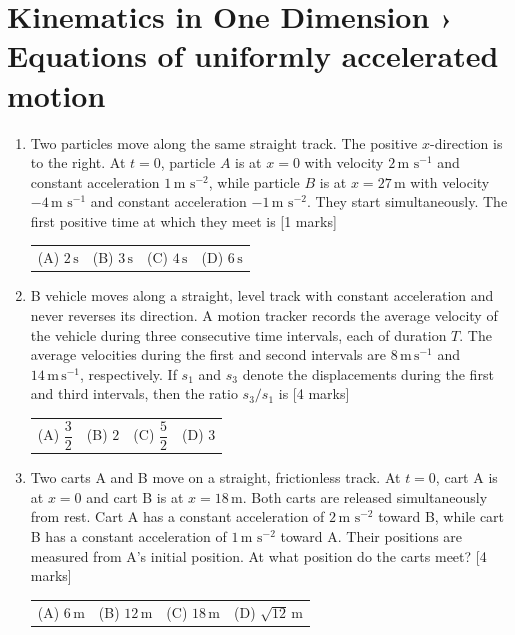 \documentclass[11pt,a4paper]{article}
\begin{document}
\section*{Kinematics in One Dimension › Equations of uniformly accelerated motion}
\begin{enumerate}[resume]
\item Two particles move along the same straight track. The positive $x$-direction is to the right. At $t=0$, particle $A$ is at $x=0$ with velocity $2\,\text{m s}^{-1}$ and constant acceleration $1\,\text{m s}^{-2}$, while particle $B$ is at $x=27\,\text{m}$ with velocity $-4\,\text{m s}^{-1}$ and constant acceleration $-1\,\text{m s}^{-2}$. They start simultaneously. The first positive time at which they meet is \hfill [1 marks]
{\renewcommand{\arraystretch}{1.8}
\begin{tabularx}{\linewidth}{X X X X}
(A) \quad $2\,\text{s}$ & (B) \quad $3\,\text{s}$ & (C) \quad $4\,\text{s}$ & (D) \quad $6\,\text{s}$ \\[10pt]
\end{tabularx}}
\item B vehicle moves along a straight, level track with constant acceleration and never reverses its direction. A motion tracker records the average velocity of the vehicle during three consecutive time intervals, each of duration $T$. The average velocities during the first and second intervals are $8\,\mathrm{m\,s^{-1}}$ and $14\,\mathrm{m\,s^{-1}}$, respectively. If $s_1$ and $s_3$ denote the displacements during the first and third intervals, then the ratio $s_3/s_1$ is \hfill [4 marks]
{\renewcommand{\arraystretch}{1.8}
\begin{tabularx}{\linewidth}{X X X X}
(A) \quad $\dfrac{3}{2}$ & (B) \quad $2$ & (C) \quad $\dfrac{5}{2}$ & (D) \quad $3$ \\[10pt]
\end{tabularx}}
\item Two carts A and B move on a straight, frictionless track. At $t=0$, cart A is at $x=0$ and cart B is at $x=18\,\text{m}$. Both carts are released simultaneously from rest. Cart A has a constant acceleration of $2\,\text{m s}^{-2}$ toward B, while cart B has a constant acceleration of $1\,\text{m s}^{-2}$ toward A. Their positions are measured from A's initial position. At what position do the carts meet? \hfill [4 marks]
{\renewcommand{\arraystretch}{1.8}
\begin{tabularx}{\linewidth}{X X X X}
(A) \quad $6\,\text{m}$ & (B) \quad $12\,\text{m}$ & (C) \quad $18\,\text{m}$ & (D) \quad $\sqrt{12}\,\text{m}$ \\[10pt]

\end{tabularx}}
\end{enumerate}
\end{document}
